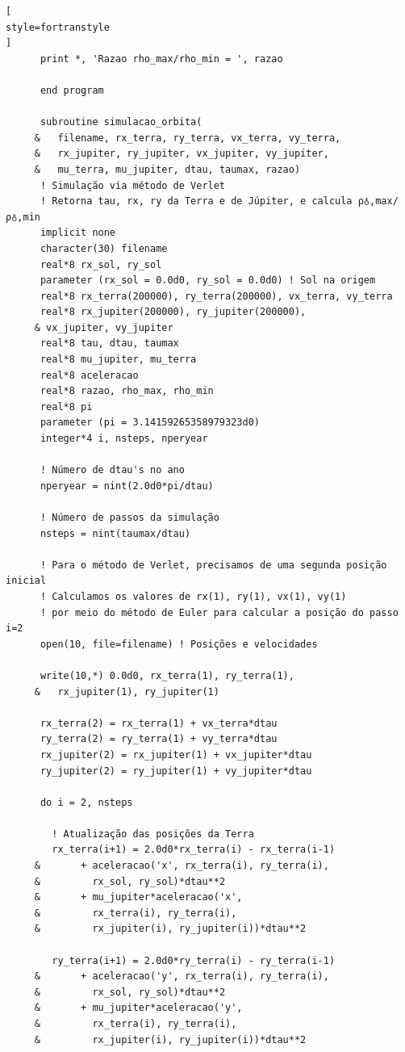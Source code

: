 \documentclass[12pt,a4paper]{article}
\begin{document}
\begin{lstlisting}[
style=fortranstyle
]
      print *, 'Razao rho_max/rho_min = ', razao

      end program

      subroutine simulacao_orbita(
     &   filename, rx_terra, ry_terra, vx_terra, vy_terra,
     &   rx_jupiter, ry_jupiter, vx_jupiter, vy_jupiter,
     &   mu_terra, mu_jupiter, dtau, taumax, razao)
      ! Simulação via método de Verlet
      ! Retorna tau, rx, ry da Terra e de Júpiter, e calcula ρ♁,max/ρ♁,min
      implicit none
      character(30) filename
      real*8 rx_sol, ry_sol
      parameter (rx_sol = 0.0d0, ry_sol = 0.0d0) ! Sol na origem
      real*8 rx_terra(200000), ry_terra(200000), vx_terra, vy_terra
      real*8 rx_jupiter(200000), ry_jupiter(200000), 
     & vx_jupiter, vy_jupiter
      real*8 tau, dtau, taumax
      real*8 mu_jupiter, mu_terra
      real*8 aceleracao
      real*8 razao, rho_max, rho_min
      real*8 pi
      parameter (pi = 3.14159265358979323d0)
      integer*4 i, nsteps, nperyear
      
      ! Número de dtau's no ano
      nperyear = nint(2.0d0*pi/dtau)

      ! Número de passos da simulação
      nsteps = nint(taumax/dtau)

      ! Para o método de Verlet, precisamos de uma segunda posição inicial
      ! Calculamos os valores de rx(1), ry(1), vx(1), vy(1)
      ! por meio do método de Euler para calcular a posição do passo i=2
      open(10, file=filename) ! Posições e velocidades

      write(10,*) 0.0d0, rx_terra(1), ry_terra(1), 
     &   rx_jupiter(1), ry_jupiter(1)

      rx_terra(2) = rx_terra(1) + vx_terra*dtau
      ry_terra(2) = ry_terra(1) + vy_terra*dtau
      rx_jupiter(2) = rx_jupiter(1) + vx_jupiter*dtau
      ry_jupiter(2) = ry_jupiter(1) + vy_jupiter*dtau

      do i = 2, nsteps

        ! Atualização das posições da Terra
        rx_terra(i+1) = 2.0d0*rx_terra(i) - rx_terra(i-1)
     &       + aceleracao('x', rx_terra(i), ry_terra(i),
     &         rx_sol, ry_sol)*dtau**2
     &       + mu_jupiter*aceleracao('x',
     &         rx_terra(i), ry_terra(i),
     &         rx_jupiter(i), ry_jupiter(i))*dtau**2

        ry_terra(i+1) = 2.0d0*ry_terra(i) - ry_terra(i-1)
     &       + aceleracao('y', rx_terra(i), ry_terra(i),
     &         rx_sol, ry_sol)*dtau**2
     &       + mu_jupiter*aceleracao('y',
     &         rx_terra(i), ry_terra(i),
     &         rx_jupiter(i), ry_jupiter(i))*dtau**2


\end{lstlisting}
\end{document}
